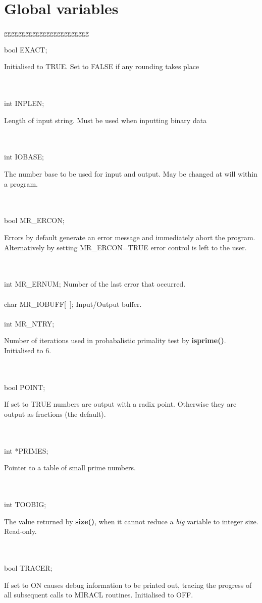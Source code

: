 \chapter{Global variables}
\pagebreak
\begin{tabbing}
gggggggggggggggggggggggg\= \kill

bool EXACT;       \>
                  \parbox[t]{3in}
                  {Initialised to TRUE. Set to FALSE if any rounding
                  takes place}\\
\ \\
int INPLEN;       \>
                  \parbox[t]{3in}
                  {Length of input string. Must be used when inputting
                   binary data}\\
\ \\
int IOBASE;       \>
                  \parbox[t]{3in}
                  {The number base to be used for input and output. May be 
                   changed at will within a program.}\\
\ \\
bool MR\_ERCON;    \>
                  \parbox[t]{3in}
                  {Errors by default generate an error message and 
                   immediately abort the program. Alternatively by setting 
                   MR\_ERCON=TRUE error control
                   is left to the user.}\\
\ \\
int MR\_ERNUM;       \>Number of the last error that occurred. \\
\ \\
char MR\_IOBUFF[\ ]; \>Input/Output buffer. \\
\ \\
int MR\_NTRY;     \> 
                  \parbox[t]{3in}
                  {Number of iterations used in probabalistic primality
                   test by {\bf isprime()}. Initialised to 6.}\\
\ \\
bool POINT;       \>
                  \parbox[t]{3in}
                  {If set to TRUE numbers are output with a radix point.
                   Otherwise they are output as fractions (the default).}\\
\ \\
int *PRIMES;      \>
                  \parbox[t]{3in}
                  {Pointer to a table of small prime numbers.}\\
\ \\
int TOOBIG;       \>
                  \parbox[t]{3in}
                  {The value returned by {\bf size()}, when it cannot reduce a 
                   {\em big} variable to integer size. Read-only.}\\
\ \\
bool TRACER;      \>
                  \parbox[t]{3in}
                  {If set to ON causes debug information to be printed out,
                   tracing the progress of all subsequent calls to MIRACL 
                   routines. Initialised to OFF.}\\
\end{tabbing}

